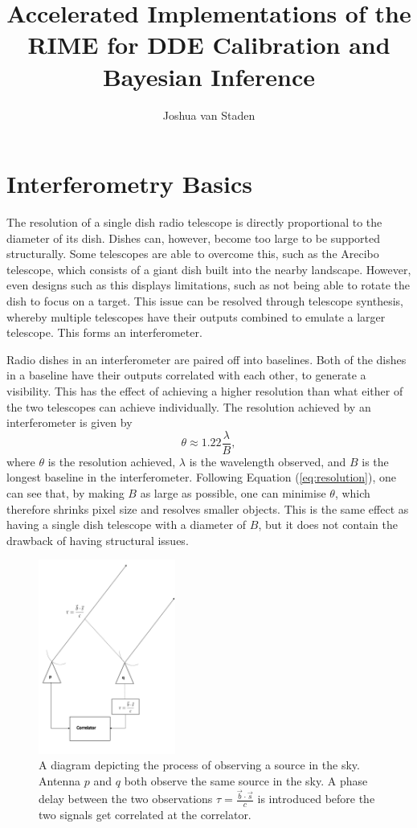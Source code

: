 \documentclass{article}
\title{Accelerated Implementations of the RIME for DDE Calibration and Bayesian Inference}
\author{Joshua van Staden}
\begin{document}
\maketitle
\section{Interferometry Basics}

The resolution of a single dish radio telescope is directly proportional to the diameter of its dish. Dishes can, however, become too large to be supported structurally. Some telescopes are able to overcome this, such as the Arecibo telescope, which consists of a giant dish built into the nearby landscape. However, even designs such as this displays limitations, such as not being able to rotate the dish to focus on a target. This issue can be resolved through telescope synthesis, whereby multiple telescopes have their outputs combined to emulate a larger telescope. This forms an interferometer.

Radio dishes in an interferometer are paired off into baselines. Both of the dishes in a baseline have their outputs correlated with each other, to generate a visibility. This has the effect of achieving a higher resolution than what either of the two telescopes can achieve individually. The resolution achieved by an interferometer is given by
\begin{equation}
\label{eq:resolution}
    \theta \approx 1.22 \frac{\lambda}{B} ,
\end{equation}
where $\theta$ is the resolution achieved, $\lambda$ is the wavelength observed, and $B$ is the longest baseline in the interferometer. Following Equation (\ref{eq:resolution}), one can see that, by making $B$ as large as possible, one can minimise $\theta$, which therefore shrinks pixel size and resolves smaller objects. This is the same effect as having a single dish telescope with a diameter of $B$, but it does not contain the drawback of having structural issues.

\begin{figure}
    \centering
    \includegraphics[width=0.4\textwidth]{DiagramTelescope.jpg}
    \caption{A diagram depicting the process of observing a source in the sky. Antenna $p$ and $q$ both observe the same source in the sky. A phase delay between the two observations $\tau = \frac{\Vec{b} \cdot \Vec{s}}{c}$ is introduced before the two signals get correlated at the correlator.}
    \label{fig:twoelement}
\end{figure}
\end{document}
